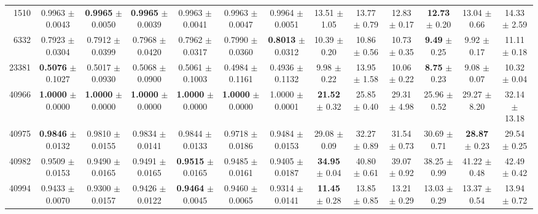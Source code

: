 \begin{table}[t]
{\begin{tabular}{@{}rcccccc@{\hspace{7pt}}cccccc@{}}
1510 & 0.9963 $\pm$ 0.0043 & \textbf{0.9965} $\pm$ 0.0050 & \textbf{0.9965} $\pm$ 0.0039 & 0.9963 $\pm$ 0.0041 & 0.9963 $\pm$ 0.0047 & 0.9964 $\pm$ 0.0051 & 13.51 $\pm$ 1.05 & 13.77 $\pm$ 0.79 & 12.83 $\pm$ 0.17 & \textbf{12.73} $\pm$ 0.20 & 13.04 $\pm$ 0.66 & 14.33 $\pm$ 2.59 \\
6332 & 0.7923 $\pm$ 0.0304 & 0.7912 $\pm$ 0.0399 & 0.7968 $\pm$ 0.0420 & 0.7962 $\pm$ 0.0317 & 0.7990 $\pm$ 0.0360 & \textbf{0.8013} $\pm$ 0.0312 & 10.39 $\pm$ 0.20 & 10.86 $\pm$ 0.56 & 10.73 $\pm$ 0.35 & \textbf{9.49} $\pm$ 0.25 & 9.92 $\pm$ 0.17 & 11.11 $\pm$ 0.18 \\
23381 & \textbf{0.5076} $\pm$ 0.1027 & 0.5017 $\pm$ 0.0930 & 0.5068 $\pm$ 0.0900 & 0.5061 $\pm$ 0.1003 & 0.4984 $\pm$ 0.1161 & 0.4936 $\pm$ 0.1132 & 9.98 $\pm$ 0.22 & 13.95 $\pm$ 1.58 & 10.06 $\pm$ 0.22 & \textbf{8.75} $\pm$ 0.23 & 9.08 $\pm$ 0.07 & 10.32 $\pm$ 0.04 \\
40966 & \textbf{1.0000} $\pm$ 0.0000 & \textbf{1.0000} $\pm$ 0.0000 & \textbf{1.0000} $\pm$ 0.0000 & \textbf{1.0000} $\pm$ 0.0000 & \textbf{1.0000} $\pm$ 0.0000 & 1.0000 $\pm$ 0.0001 & \textbf{21.52} $\pm$ 0.32 & 25.85 $\pm$ 0.40 & 29.31 $\pm$ 4.98 & 25.96 $\pm$ 0.52 & 29.27 $\pm$ 8.20 & 32.14 $\pm$ 13.18 \\
40975 & \textbf{0.9846} $\pm$ 0.0132 & 0.9810 $\pm$ 0.0155 & 0.9834 $\pm$ 0.0141 & 0.9844 $\pm$ 0.0133 & 0.9718 $\pm$ 0.0186 & 0.9484 $\pm$ 0.0153 & 29.08 $\pm$ 0.09 & 32.27 $\pm$ 0.89 & 31.54 $\pm$ 0.73 & 30.69 $\pm$ 0.71 & \textbf{28.87} $\pm$ 0.23 & 29.54 $\pm$ 0.25 \\
40982 & 0.9509 $\pm$ 0.0153 & 0.9490 $\pm$ 0.0165 & 0.9491 $\pm$ 0.0165 & \textbf{0.9515} $\pm$ 0.0165 & 0.9485 $\pm$ 0.0161 & 0.9405 $\pm$ 0.0187 & \textbf{34.95} $\pm$ 0.04 & 40.80 $\pm$ 0.61 & 39.07 $\pm$ 0.92 & 38.25 $\pm$ 0.99 & 41.22 $\pm$ 0.48 & 42.49 $\pm$ 0.42 \\
40994 & 0.9433 $\pm$ 0.0070 & 0.9300 $\pm$ 0.0157 & 0.9426 $\pm$ 0.0122 & \textbf{0.9464} $\pm$ 0.0045 & 0.9460 $\pm$ 0.0065 & 0.9314 $\pm$ 0.0141 & \textbf{11.45} $\pm$ 0.28 & 13.85 $\pm$ 0.85 & 13.21 $\pm$ 0.29 & 13.03 $\pm$ 0.29 & 13.37 $\pm$ 0.54 & 13.94 $\pm$ 0.72 \\
\bottomrule
\end{tabular}%
}
\end{table}
